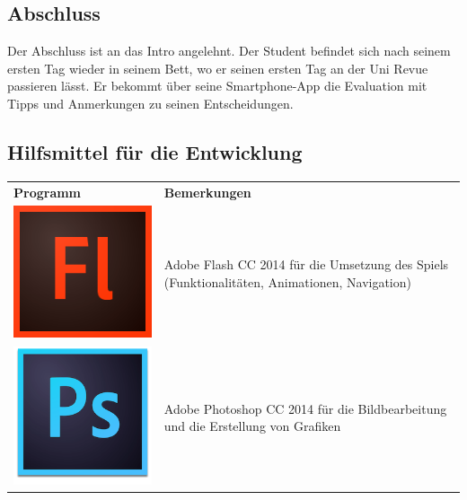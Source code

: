\documentclass[a4paper, 11pt]{article} %
\begin{document}
\subsection{Abschluss}
Der Abschluss ist an das Intro angelehnt. Der Student befindet sich nach seinem ersten Tag wieder in seinem Bett, wo er seinen ersten Tag an der Uni Revue passieren lässt. Er bekommt über seine Smartphone-App die Evaluation mit Tipps und Anmerkungen zu seinen Entscheidungen. 

\subsection{Hilfsmittel für die Entwicklung}
\begin{tabular}{lp{9cm}}
\textbf{Programm} & \textbf{Bemerkungen} \\ 
\includegraphics[scale=0.35]{images/flash.png} & 
\nohyphens{
Adobe Flash CC 2014 für die Umsetzung des Spiels
(Funktionalitäten, Animationen, Navigation)
} \\
\includegraphics[scale=0.5]{images/photoshop.png} & 
\nohyphens{
Adobe Photoshop CC 2014 für die Bildbearbeitung und die Erstellung von Grafiken
} \\

\end{tabular}
\end{document}

